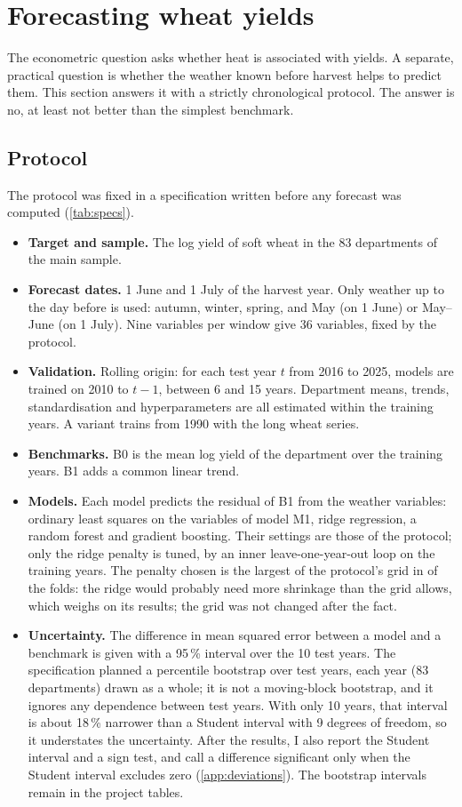 \section{Forecasting wheat yields}
\label{sec:forecasting}

The econometric question asks whether heat is associated with yields. A separate, practical question is whether the weather known before harvest helps to predict them. This section answers it with a strictly chronological protocol. The answer is no, at least not better than the simplest benchmark.

\subsection{Protocol}

The protocol was fixed in a specification written before any forecast was computed (\cref{tab:specs}).
\begin{itemize}
  \item \textbf{Target and sample.} The log yield of soft wheat in the 83 departments of the main sample.
  \item \textbf{Forecast dates.} 1 June and 1 July of the harvest year. Only weather up to the day before is used: autumn, winter, spring, and May (on 1 June) or May--June (on 1 July). Nine variables per window give 36 variables, fixed by the protocol.
  \item \textbf{Validation.} Rolling origin: for each test year $t$ from 2016 to 2025, models are trained on 2010 to $t-1$, between 6 and 15 years. Department means, trends, standardisation and hyperparameters are all estimated within the training years. A variant trains from 1990 with the long wheat series.
  \item \textbf{Benchmarks.} B0 is the mean log yield of the department over the training years. B1 adds a common linear trend.
  \item \textbf{Models.} Each model predicts the residual of B1 from the weather variables: ordinary least squares on the variables of model M1, ridge regression, a random forest and gradient boosting. Their settings are those of the protocol; only the ridge penalty is tuned, by an inner leave-one-year-out loop on the training years. The penalty chosen is the largest of the protocol's grid in \AlphaTopFolds{} of the \AlphaFolds{} folds: the ridge would probably need more shrinkage than the grid allows, which weighs on its results; the grid was not changed after the fact.
  \item \textbf{Uncertainty.} The difference in mean squared error between a model and a benchmark is given with a 95\,\% interval over the 10 test years. The specification planned a percentile bootstrap over test years, each year (83 departments) drawn as a whole; it is not a moving-block bootstrap, and it ignores any dependence between test years. With only 10 years, that interval is about 18\,\% narrower than a Student interval with 9 degrees of freedom, so it understates the uncertainty. After the results, I also report the Student interval and a sign test, and call a difference significant only when the Student interval excludes zero (\cref{app:deviations}). The bootstrap intervals remain in the project tables.
\end{itemize}
